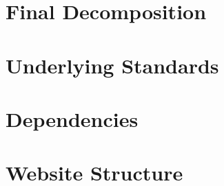 \section{Final Decomposition}

\section{Underlying Standards}

\section{Dependencies}

\section{Website Structure}

